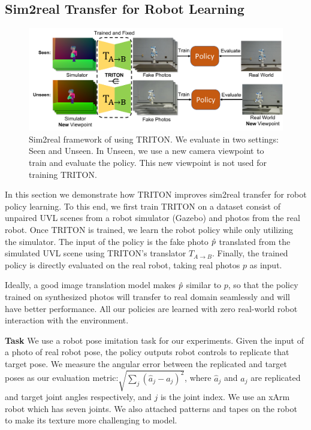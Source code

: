 \documentclass{article}
\begin{document}
\subsection{Sim2real Transfer for Robot Learning}
\begin{figure}[thbp]
    \centering
    \vspace{-10pt}
    \includegraphics[width=.8\textwidth]{../images/sim2real_framework.pdf}
    \vspace{-10pt}
    \caption{Sim2real framework of using TRITON. We evaluate in two settings: Seen and Unseen. In Unseen, we use a new camera viewpoint to train and evaluate the policy. This new viewpoint is not used for training TRITON. }
    \vspace{-5pt}
    \label{fig:sim2realframework}
\end{figure}
In this section we demonstrate how TRITON improves sim2real transfer for robot policy learning. To this end, we first train TRITON on a dataset consist of unpaired UVL scenes from a robot simulator (Gazebo) and photos from the real robot. Once TRITON is trained, we learn the robot policy while only utilizing the simulator. The input of the policy is the fake photo $\hat{p}$ translated from the simulated UVL scene using TRITON's translator $T_{A\to B}$. Finally, the trained policy is directly evaluated on the real robot, taking real photos $p$ as input.

Ideally, a good image translation model makes $\hat{p}$ similar to $p$, so that the policy trained on synthesized photos will transfer to real domain seamlessly and will have better performance. All our policies are learned with zero real-world robot interaction with the environment.

\textbf{Task} We use a robot pose imitation task for our experiments. Given the input of a photo of real robot pose, the policy outputs robot controls to replicate that target pose. We measure the angular error between the replicated and target poses as our evaluation metric:$\sqrt{\sum_{j} (\hat{a}_j - a_j)^2}$,
where $\hat{a}_j$ and $a_j$ are replicated and target joint angles respectively, and $j$ is the joint index. We use an xArm robot which has seven joints. We also attached patterns and tapes on the robot to make its texture more challenging to model.
\end{document}
